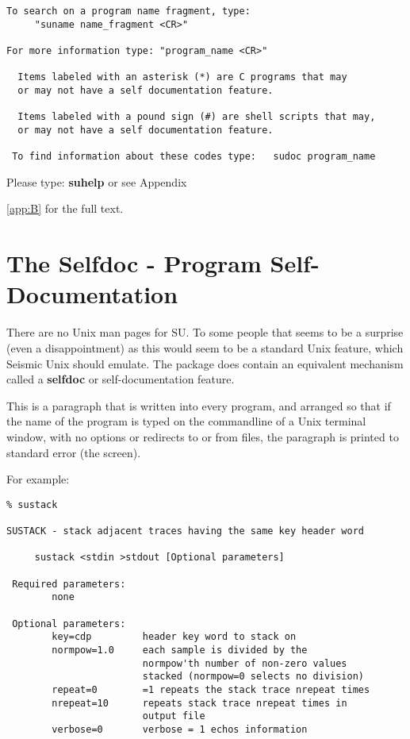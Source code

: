 {{\begin{verbatim}
To search on a program name fragment, type:
     "suname name_fragment <CR>"

For more information type: "program_name <CR>"

  Items labeled with an asterisk (*) are C programs that may
  or may not have a self documentation feature.

  Items labeled with a pound sign (#) are shell scripts that may,
  or may not have a self documentation feature.

 To find information about these codes type:   sudoc program_name

\end{verbatim}}\noindent

Please type: {\bf suhelp\/} or see Appendix~{\ref{app:B} for the full text.


\section{The Selfdoc - Program Self-Documentation}

There are no Unix man pages for SU. To some people that seems
to be a surprise (even a disappointment) as this would seem to be
a standard Unix feature, which Seismic Unix should emulate.
The package does contain an equivalent mechanism called a 
{\bf selfdoc\/} or self-documentation feature.

This is a paragraph that is written into every program, and arranged
so that if the name of the program is typed on the commandline
of a Unix terminal window, with no options or redirects to or 
from files, the paragraph is printed to standard error (the screen).

For example:
{\small\begin{verbatim}
% sustack

SUSTACK - stack adjacent traces having the same key header word
                                                                
     sustack <stdin >stdout [Optional parameters]               
                                                                
 Required parameters:                                           
        none                                                    
                                                                
 Optional parameters:                                           
        key=cdp         header key word to stack on             
        normpow=1.0     each sample is divided by the           
                        normpow'th number of non-zero values    
                        stacked (normpow=0 selects no division) 
        repeat=0        =1 repeats the stack trace nrepeat times
        nrepeat=10      repeats stack trace nrepeat times in    
                        output file                             
        verbose=0       verbose = 1 echos information           
                                                                

\end{verbatim}}}}
